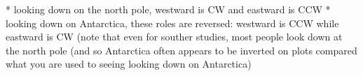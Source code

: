 
* looking down on the north pole, westward is CW and eastward is CCW
* looking down on Antarctica, these roles are reversed: westward is CCW while
eastward is CW (note that even for souther studies, most people look down at
the north pole (and so Antarctica often appears to be inverted on plots
compared what you are used to seeing looking down on Antarctica)
